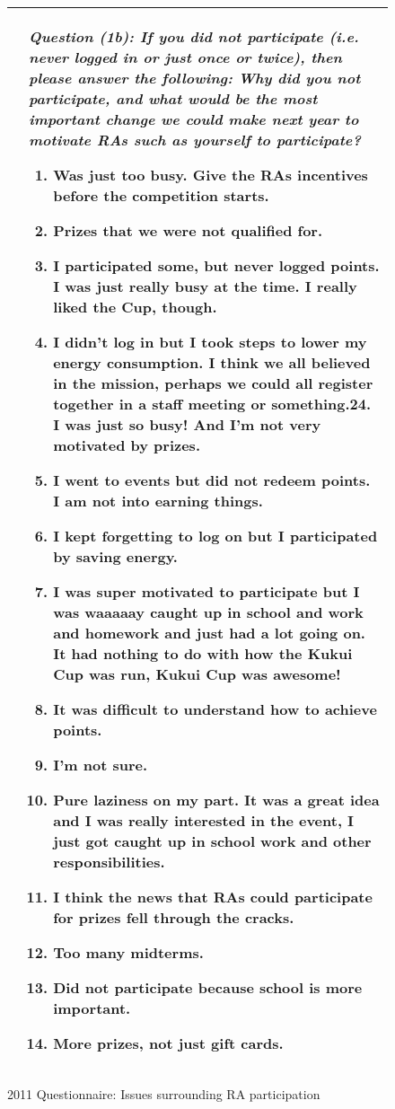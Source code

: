 \documentclass[]{IEEEconf}
\begin{document}
\begin{figure*}[t]
\begin{tabular}{|l|l|}
&

\small  \begin{minipage}[t]{3in}
{\em Question (1b): If you did not participate (i.e. never logged in or just once or twice), then please answer the 
following:  Why did you not participate, and what would be the most important change we could make next year to 
motivate RAs such as yourself to participate? }
\begin{enumerate}
\item Was just too busy.  Give the RAs incentives before the competition starts.
\item Prizes that we were not qualified for.
\item I participated some, but never logged points.  I was just really busy at the time.  I really liked the Cup, 
though.
\item I didn't log in but I took steps to lower my energy consumption.   I think we all believed in the mission, 
perhaps we could all register together in a staff meeting or something.24. I was just so busy!   And I'm not very motivated by prizes. 
\item I went to events but did not redeem points.  I am not into earning things. 
\item I kept forgetting to log on but I participated by saving energy.
\item I was super motivated to participate but I was waaaaay caught up in school and work and homework and 
just had a lot going on.   It had nothing to do with how the Kukui Cup was run, Kukui Cup was awesome!
\item It was difficult to understand how to achieve points. 
\item I'm not sure. 
\item Pure laziness on my part.  It was a great idea and I was really interested in the event, I just got caught up 
in school work and other responsibilities.
\item I think the news that RAs could participate for prizes fell through the cracks. 
\item Too many midterms.  
\item Did not participate because school is more important.  
\item More prizes, not just gift cards.
\end{enumerate}
\end{minipage}  \normalsize
\\
\hline
\end{tabular}
\caption{2011 Questionnaire: Issues surrounding RA participation}
\label{fig:ra-participation-2011}
\end{figure*}
\end{document}
